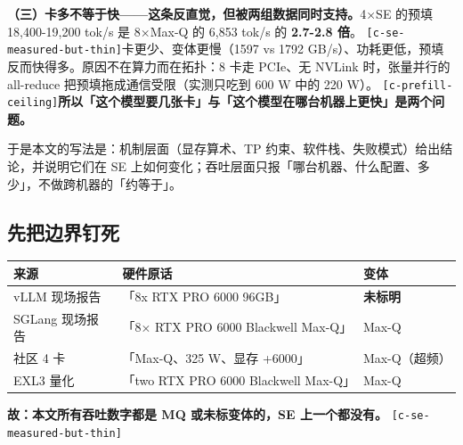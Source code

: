 \textbf{（三）卡多不等于快——这条反直觉，但被两组数据同时支持。}4×SE 的预填 18,400-\hspace{0pt}19,200 tok/s 是 8×Max-Q 的 6,853 tok/s 的 \textbf{2.7-\hspace{0pt}2.8 倍}。 {\scriptsize\texttt{[c-\hspace{0pt}se-\hspace{0pt}measured-\hspace{0pt}but-\hspace{0pt}thin]}}卡更少、变体更慢（1597 vs 1792 GB/s）、功耗更低，预填反而快得多。原因不在算力而在拓扑：8 卡走 PCIe、无 NVLink 时，张量并行的 all-reduce 把预填拖成通信受限（实测只吃到 600 W 中的 220 W）。 {\scriptsize\texttt{[c-\hspace{0pt}prefill-\hspace{0pt}ceiling]}}\textbf{所以「这个模型要几张卡」与「这个模型在哪台机器上更快」是两个问题。}


于是本文的写法是：机制层面（显存算术、TP 约束、软件栈、失败模式）给出结论，并说明它们在 SE 上如何变化；吞吐层面只报「哪台机器、什么配置、多少」，不做跨机器的「约等于」。


\subsection{先把边界钉死}

\begin{table}[t]
\centering
\footnotesize
\setlength{\tabcolsep}{4pt}
\label{tab:7}
\begin{tabularx}{\textwidth}{lXl}
\toprule
来源 & 硬件原话 & 变体 \\
\midrule
vLLM 现场报告 & 「8x RTX PRO 6000 96GB」 & \textbf{未标明} \\
SGLang 现场报告 & 「8× RTX PRO 6000 Blackwell Max-Q」 & Max-Q \\
社区 4 卡 & 「Max-Q、325 W、显存 +6000」 & Max-Q（超频） \\
EXL3 量化 & 「two RTX PRO 6000 Blackwell Max-Q」 & Max-Q \\
\bottomrule
\end{tabularx}
\end{table}

\textbf{故：本文所有吞吐数字都是 MQ 或未标变体的，SE 上一个都没有。} {\scriptsize\texttt{[c-\hspace{0pt}se-\hspace{0pt}measured-\hspace{0pt}but-\hspace{0pt}thin]}}


